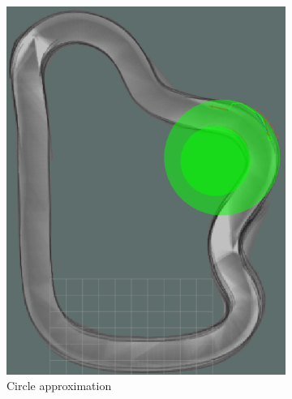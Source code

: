 \begin{figure}[H]
	\centering
	\begin{subfigure}{.45\linewidth}
		\includegraphics[width=\textwidth]{Pictures/circle approx}
		\caption{Circle approximation}
		\end{subfigure}	
	\begin{subfigure}{.45\linewidth}

\end{subfigure}
\end{figure}
